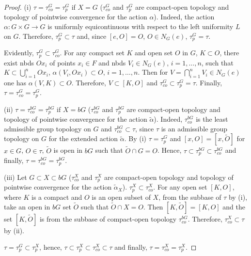 \documentclass{amsart}
\begin{document}
\begin{proof} 
(i) $\tau=\tau^G_{co}=\tau^G_p$ if $X=G$ ($\tau^G_{co}$ and $\tau^G_p$ are compact-open topology and topology of pointwise convergence for the action $\alpha$). Indeed, the action  $\alpha: G\times G\to G$ is uniformly equicontinuous with respect to the left uniformity $L$ on $G$. Therefore, $\tau^G_p\subset\tau$ and, since $[e, O]=O$, $O\in N_G (e)$, $\tau^G_p=\tau$. 

Evidently, $\tau^G_p\subset\tau^G_{co}$. For any compact set $K$ and open set $O$ in $G$, $K\subset O$, there exist nbds $Ox_i$ of points $x_i\in F$ and nbds $V_i\in N_G(e)$, $i=1,\ldots, n$, such that $K\subset\bigcup\limits_{i=1}^n Ox_i$, $\alpha (V_i, Ox_i)\subset O$, $i=1,\ldots, n$. Then for $V=\bigcap\limits_{i=1}^n V_i\in N_G(e)$ one has $\alpha (V, K)\subset O$. Therefore, $V\subset [K, O]$ and $\tau^G_{co}\subset\tau^G_p=\tau$. Finally, $\tau=\tau^G_{co}=\tau^G_p$. 

\medskip

(ii) $\tau=\tau^{b G}_{co}=\tau^{b G}_p$ if $X=b G$ ($\tau^{b G}_{co}$ and $\tau^{b G}_p$ are compact-open topology and topology of pointwise convergence for the action $\tilde\alpha$). Indeed, $\tau^{b G}_{co}$ is the least admissible group topology on $G$ and $\tau^{b G}_{co}\subset\tau$, since $\tau$ is an admissible group topology on $G$ for the extended action $\tilde\alpha$. By (i) $\tau=\tau_p^G$ and $[x, O]=[x, \tilde O]$ for $x\in G$, $O\in\tau$, $\tilde O$ is open in $b G$ such that $\tilde O\cap G=O$. Hence, $\tau\subset\tau^{b G}_p\subset\tau^{b G}_{co}$ and finally, $\tau=\tau^{b G}_{co}=\tau^{b G}_p$. 

\medskip

(iii) Let $G\subset X\subset b G$ ($\tau^X_{co}$ and $\tau^X_p$ are compact-open topology and topology of pointwise convergence for the action $\tilde\alpha_X$). $\tau^X_p\subset\tau^X_{co}$. For any open set $[K, O]$, where $K$ is a compact and $O$ is an open subset of $X$, from the subbase of $\tau$ by (i), take an open in $b G$ set $\tilde O$ such that $\tilde O\cap X=O$. Then $[K, \tilde O]=[K, O]$ and the set $[K, \tilde O]$ is from the subbase of compact-open topology $\tau_{co}^{b G}$. Therefore, $\tau^X_{co}\subset\tau$ by (ii). 

$\tau=\tau_p^G\subset\tau^X_p$, hence, $\tau\subset\tau^X_p\subset\tau^X_{co}\subset\tau$ and finally,  $\tau=\tau^X_{co}=\tau^X_p$.
\end{proof}

\end{document}
